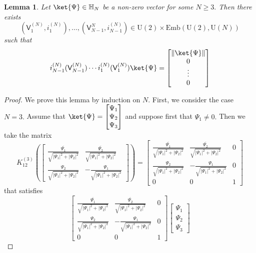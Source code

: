 \documentclass[a4paper,11pt]{article}
\newtheorem{lemma}[theorem]{Lemma}
\newcommand{\rV}{\mathsf{V}}
\begin{document}
\begin{appendices}
    \begin{lemma}\label{reduction}
      Let $\ket{\Psi} \in \mathbb{H}_N$ be a non-zero vector for some $N\ge 3.$ Then there exists 
      $$
      (\rV_1^{(N)},i_1^{(N)}),\ldots,(\rV_{N-1}^{N},i_{N-1}^{(N)}) \in \mathrm{U}(2)  \times \mathrm{Emb}(\mathrm{U}(2),\mathrm{U}(N))
      $$ 
      such that
      $$
      i_{N-1}^{(N)}(\rV_{N-1}^{(N)}) \cdots i_1^{(N)}(\rV_1^{(N)}) \ket{\Psi} =  \begin{bmatrix} \|\ket{\Psi}\| \\ 0 \\ \vdots  \\ 0 \end{bmatrix}
      $$
      \end{lemma}
      \begin{proof}
      We prove this lemma by induction on $N.$ First, we consider the case $N=3.$ Assume that $\ket{\Psi} = \begin{bmatrix} \Psi_1 \\ \Psi_2 \\ \Psi_3 \end{bmatrix}$ and suppose first that $\Psi_1 \neq 0.$ Then we take the matrix
      $$
      K_{12}^{(3)}\left( \begin{bmatrix}
        \frac{\overline{\Psi_1}}{\sqrt{ |\Psi_1|^2+|\Psi_2|^2}} & \frac{\overline{\Psi_2}}{\sqrt{ |\Psi_1|^2+|\Psi_2|^2}} \\
        \frac{\Psi_2}{\sqrt{ |\Psi_1|^2+|\Psi_2|^2}} & -\frac{\Psi_1}{\sqrt{ |\Psi_1|^2+|\Psi_2|^2}} \end{bmatrix} \right)  =\begin{bmatrix}
      \frac{\overline{\Psi_1}}{\sqrt{ |\Psi_1|^2+|\Psi_2|^2}} & \frac{\overline{\Psi_2}}{\sqrt{ |\Psi_1|^2+|\Psi_2|^2}} & 0 \\
      \frac{\Psi_2}{\sqrt{ |\Psi_1|^2+|\Psi_2|^2}} & -\frac{\Psi_1}{\sqrt{ |\Psi_1|^2+|\Psi_2|^2}} & 0 \\
      0 & 0 & 1
      \end{bmatrix}
      $$ 
      that satisfies
      $$
      \begin{bmatrix}
        \frac{\overline{\Psi_1}}{\sqrt{ |\Psi_1|^2+|\Psi_2|^2}} & \frac{\overline{\Psi_2}}{\sqrt{ |\Psi_1|^2+|\Psi_2|^2}} & 0 \\
        \frac{\Psi_2}{\sqrt{ |\Psi_1|^2+|\Psi_2|^2}} & -\frac{\Psi_1}{\sqrt{ |\Psi_1|^2+|\Psi_2|^2}} & 0 \\
        0 & 0 & 1
        \end{bmatrix} \begin{bmatrix} \Psi_1 \\ \Psi_2 \\ \Psi_3 \end{bmatrix} 
$$
\end{proof}
\end{appendices}
\end{document}
